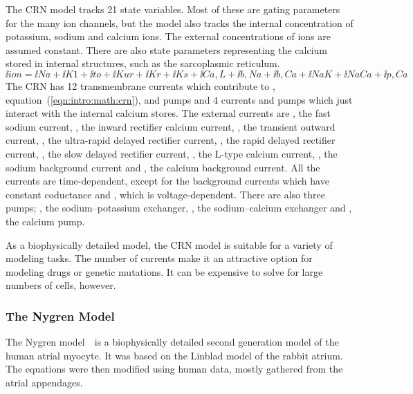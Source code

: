 The CRN model tracks 21 state variables.
Most of these are gating parameters for the many ion channels, but the model
also tracks the internal concentration of potassium, sodium and calcium ions.
The external concentrations of ions are assumed constant.
There are also state parameters representing the calcium stored in internal
structures, such as the sarcoplasmic reticulum.
\begin{equation}
\label{eqn:intro:math:crn}
\ii{ion} = \ii{Na} + \ii{K1} + \ii{to} + \ii{Kur} + \ii{Kr} + \ii{Ks} +
\ii{Ca,L} + \ii{b,Na} + \ii{b,Ca} + \ii{NaK} + \ii{NaCa} + \ii{p,Ca}
\end{equation}
The CRN has 12 transmembrane currents which contribute to ,
equation~(\ref{eqn:intro:math:crn}), and pumps and 4 currents and
pumps which just interact with the internal calcium stores.
The external currents are , the fast sodium current, , the inward
rectifier calcium current, , the transient outward current, , the
ultra-rapid delayed rectifier current, , the rapid delayed rectifier
current, , the slow delayed rectifier current, , the L-type
calcium current, , the sodium background current and , the
calcium background current.
All the currents are time-dependent, except for the background currents which
have constant coductance and , which is voltage-dependent.
There are also three pumps; , the sodium--potassium exchanger,
, the sodium--calcium exchanger and , the calcium pump.

As a biophysically detailed model, the CRN model is suitable for a variety of
modeling tasks.
The number of currents make it an attractive option for modeling drugs or
genetic mutations.
It can be expensive to solve for large numbers of cells, however.

\subsubsection{The Nygren Model}

The Nygren model~\cite{Nygren1998}\ is a biophysically detailed second
generation model of the human atrial myocyte.
It was based on the Linblad model of the rabbit atrium.
The equations were then modified using human data, mostly gathered from the
atrial appendages.

